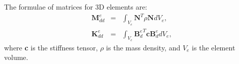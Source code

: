 \documentclass[sensors,article,accept,moreauthors,pdftex]{Definitions/mdpi}
\begin{document}
\begin{paracol}{2}
{%
}


\appendixstart
\appendix

\section{}
\label{app:matrices}
The formulae of matrices for 3D elements are:
\begin{eqnarray}
\textbf{M}_{dd}^e & = & \int_{V_e}\textbf{N}^T\rho \textbf{N} dV_e,\\
\textbf{K}_{dd}^e & = & \int_{V_e}{\textbf{B}_d^e}^T\textbf{c}\textbf{B}_d^edV_e,
\end{eqnarray}
where \textbf{c} is the stiffness tensor, \(\rho\) is the mass density, and \(V_e\) is the element volume.


\end{paracol}
\end{document}
